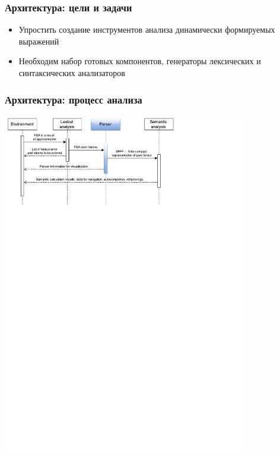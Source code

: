 \documentclass{beamer}
\begin{document}
\begin{frame}
    \transwipe[direction=90]
    \frametitle{Архитектура: цели и задачи}
    \begin{itemize}
        \item Упростить создание инструментов анализа динамически формируемых выражений
        \item Необходим набор готовых компонентов, генераторы лексических и синтаксических анализаторов
    \end{itemize}
\end{frame}

\begin{frame}
    \transwipe[direction=90]
    \frametitle{Архитектура: процесс анализа}
    \begin{center}
        \includegraphics[width=300pt]{pictures/Seq.pdf}
    \end{center}
\end{frame}
\end{document}
